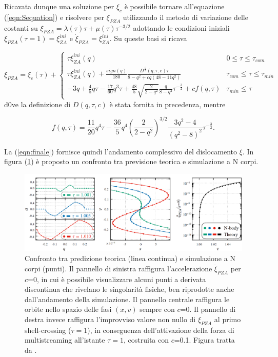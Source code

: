 Ricavata dunque una soluzione per $\xi_c$ è possibile tornare all'equazione (\ref{eqn:Sequation}) 
e risolvere per $\xi_{PZA}$ utilizzando il metodo di variazione delle costanti su 
$\xi_{PZA} = \lambda(\tau)\tau + \mu(\tau)\tau^{-3/2}$ adottando le condizioni iniziali 
$\xi_{PZA}(\tau = 1) = \xi_{ZA}^{ini}$ e $\dot{\xi}_{PZA}=\xi_{ZA}^{ini}$. Su queste basi si 
ricava

\begin{equation}
    \label{eqn:finale}
    \xi_{PZA} = \xi_c(\tau) + 
    \begin{cases}
        \tau \xi_{ZA}^{ini}(q) & 0 \leq \tau \leq \tau_{com} \\
        \tau \xi_{ZA}^{ini}(q) +\frac{sign(q)}{180} \frac{D^{\frac{5}{2}}(q, \tau, c)\tau}{8-q^2+cq(48-11q^2)} & \tau_{com} \leq \tau \leq \tau_{min} \\
        -3q + \frac{4}{5}q\tau -\frac{17}{60}q^3\tau +\frac{48}{5} \sqrt{\frac{2}{2-q^2}} \frac{q}{8-q^2}\tau^{-\frac{3}{2}}+cf(q, \tau) & \tau_{min} \leq \tau
    \end{cases}
\end{equation}
d0ve la definizione di $D(q, \tau, c)$ è stata fornita in precedenza, mentre 


\begin{equation}
    f(q, \tau) = \frac{11}{20}q^4\tau -\frac{36}{5}q^4\left(\frac{2}{2-q^2}\right)^{3/2}\frac{3q^2-4}{(q^2-8)^2}\tau^{-\frac{3}{2}}.
\end{equation}

La (\ref{eqn:finale}) fornisce quindi l'andamento complessivo del dislocamento $\xi$. In figura (\ref{fig:fig2}) è proposto un confronto
tra previsione teorica e simulazione a N corpi.


\begin{center}
    \begin{figure}[H]
		\centering
		\includegraphics[scale=0.35, angle=0]{fig2.png}
        \caption{Confronto tra predizione teorica (linea continua) e simulazione a N corpi (punti).
        Il pannello di sinistra raffigura l'accelerazione $\ddot{\xi}_{PZA}$ per $c$=0, in cui è possibile 
        visualizzare alcuni punti a derivata discontinua che rivelano le singolarità fisiche, ben riprodotte 
        anche dall'andamento della simulazione. Il pannello centrale raffigura le orbite nello spazio delle fasi 
        $(x, v)$ sempre con $c$=0. Il pannello di destra invece raffigura l'improvviso valore non nullo di $\xi_{PZA}$
        al primo shell-crossing ($\tau = 1$), in conseguenza dell'attivazione della forza di multistreaming all'istante
        $\tau = 1$, costruita con $c$=0.1. Figura tratta da \cite{rampf}.
        }
        \label{fig:fig2}
	\end{figure}
\end{center}

